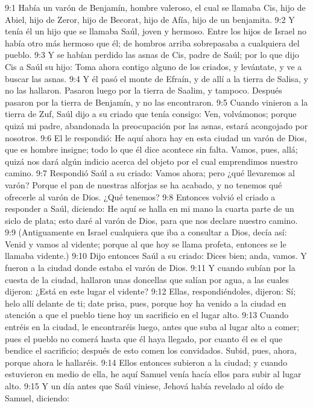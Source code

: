 9:1 Había un varón de Benjamín, hombre valeroso, el cual se llamaba Cis, hijo de Abiel, hijo de Zeror, hijo de Becorat, hijo de Afía, hijo de un benjamita.  
9:2 Y tenía él un hijo que se llamaba Saúl, joven y hermoso. Entre los hijos de Israel no había otro más hermoso que él; de hombros arriba sobrepasaba a cualquiera del pueblo.  
9:3 Y se habían perdido las asnas de Cis, padre de Saúl; por lo que dijo Cis a Saúl su hijo: Toma ahora contigo alguno de los criados, y levántate, y ve a buscar las asnas.  
9:4 Y él pasó el monte de Efraín, y de allí a la tierra de Salisa, y no las hallaron. Pasaron luego por la tierra de Saalim, y tampoco. Después pasaron por la tierra de Benjamín, y no las encontraron.  
9:5 Cuando vinieron a la tierra de Zuf, Saúl dijo a su criado que tenía consigo: Ven, volvámonos; porque quizá mi padre, abandonada la preocupación por las asnas, estará acongojado por nosotros.  
9:6 El le respondió: He aquí ahora hay en esta ciudad un varón de Dios, que es hombre insigne; todo lo que él dice acontece sin falta. Vamos, pues, allá; quizá nos dará algún indicio acerca del objeto por el cual emprendimos nuestro camino.  
9:7 Respondió Saúl a su criado: Vamos ahora; pero ¿qué llevaremos al varón? Porque el pan de nuestras alforjas se ha acabado, y no tenemos qué ofrecerle al varón de Dios. ¿Qué tenemos?  
9:8 Entonces volvió el criado a responder a Saúl, diciendo: He aquí se halla en mi mano la cuarta parte de un siclo de plata;  esto daré al varón de Dios, para que nos declare nuestro camino.  
9:9 (Antiguamente en Israel cualquiera que iba a consultar a Dios, decía así: Venid y vamos al vidente; porque al que hoy se llama profeta, entonces se le llamaba vidente.)  
9:10 Dijo entonces Saúl a su criado: Dices bien; anda, vamos. Y fueron a la ciudad donde estaba el varón de Dios.  
9:11 Y cuando subían por la cuesta de la ciudad, hallaron unas doncellas que salían por agua, a las cuales dijeron: ¿Está en este lugar el vidente?  
9:12 Ellas, respondiéndoles, dijeron: Sí; helo allí delante de ti; date prisa, pues, porque hoy ha venido a la ciudad en atención a que el pueblo tiene hoy un sacrificio en el lugar alto.  
9:13 Cuando entréis en la ciudad, le encontraréis luego, antes que suba al lugar alto a comer; pues el pueblo no comerá hasta que él haya llegado, por cuanto él es el que bendice el sacrificio; después de esto comen los convidados. Subid, pues, ahora, porque ahora le hallaréis.  
9:14 Ellos entonces subieron a la ciudad; y cuando estuvieron en medio de ella, he aquí Samuel venía hacía ellos para subir al lugar alto.  
9:15 Y un día antes que Saúl viniese, Jehová había revelado al oído de Samuel, diciendo:  

